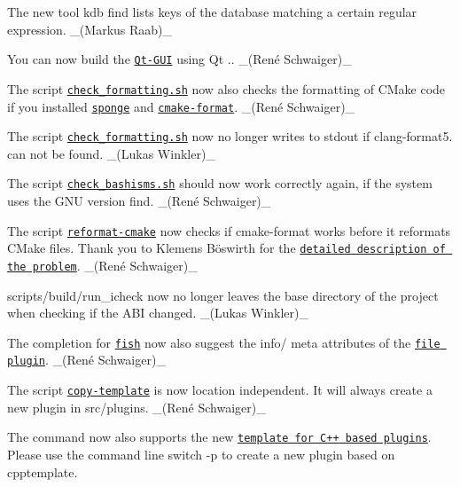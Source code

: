 \begin{DoxyItemize}
\item The new tool {\ttfamily kdb find} lists keys of the database matching a certain regular expression. \+\_\+(\+Markus Raab)\+\_\+
\item You can now build the \href{https://www.libelektra.org/tools/qt-gui}{\tt Qt-\/\+G\+UI} using Qt {.}. \+\_\+(René Schwaiger)\+\_\+
\end{DoxyItemize}


\begin{DoxyItemize}
\item The script \href{https://master.libelektra.org/tests/shell/check_formatting.sh}{\tt {\ttfamily check\+\_\+formatting.\+sh}} now also checks the formatting of C\+Make code if you installed \href{https://joeyh.name/code/moreutils}{\tt {\ttfamily sponge}} and \href{https://github.com/cheshirekow/cmake_format}{\tt {\ttfamily cmake-\/format}}. \+\_\+(René Schwaiger)\+\_\+
\item The script \href{https://master.libelektra.org/tests/shell/check_formatting.sh}{\tt {\ttfamily check\+\_\+formatting.\+sh}} now no longer writes to stdout if clang-\/format5. can not be found. \+\_\+(\+Lukas Winkler)\+\_\+
\item The script \href{https://master.libelektra.org/tests/shell/check_bashisms.sh}{\tt {\ttfamily check\+\_\+bashisms.\+sh}} should now work correctly again, if the system uses the G\+NU version {\ttfamily find}. \+\_\+(René Schwaiger)\+\_\+
\item The script \href{https://master.libelektra.org/scripts/dev/reformat-cmake}{\tt {\ttfamily reformat-\/cmake}} now checks if {\ttfamily cmake-\/format} works before it reformats C\+Make files. Thank you to Klemens Böswirth for the \href{https://github.com/ElektraInitiative/libelektra/pull/1903#discussion_r189332987}{\tt detailed description of the problem}. \+\_\+(René Schwaiger)\+\_\+
\item {\ttfamily scripts/build/run\+\_\+icheck} now no longer leaves the base directory of the project when checking if the A\+BI changed. \+\_\+(\+Lukas Winkler)\+\_\+
\item The completion for \href{http://fishshell.com}{\tt fish} now also suggest the {\ttfamily info/} meta attributes of the \href{https://www.libelektra.org/plugins/file}{\tt file plugin}. \+\_\+(René Schwaiger)\+\_\+
\end{DoxyItemize}


\begin{DoxyItemize}
\item The script \href{https://master.libelektra.org/scripts/dev/copy-template}{\tt {\ttfamily copy-\/template}} is now location independent. It will always create a new plugin in {\ttfamily src/plugins}. \+\_\+(René Schwaiger)\+\_\+
\item The command now also supports the new \href{https://www.libelektra.org/plugins/cpptemplate}{\tt template for C++ based plugins}. Please use the command line switch {\ttfamily -\/p} to create a new plugin based on {\ttfamily cpptemplate}.
\end{DoxyItemize}


